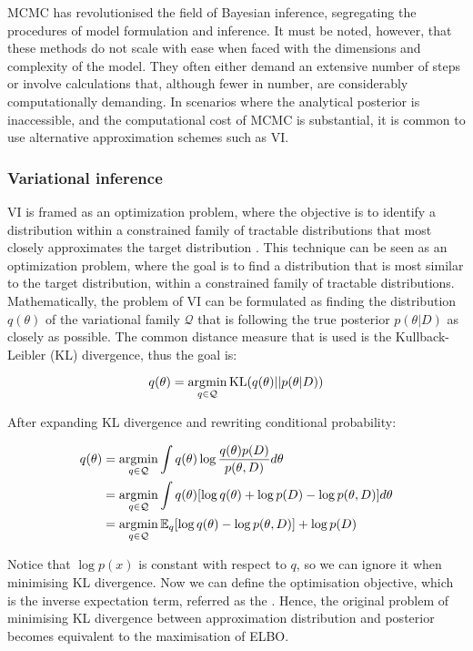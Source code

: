 \ac{MCMC} has revolutionised the field of Bayesian inference, segregating the procedures of model formulation and inference. It must be noted, however, that these methods do not scale with ease when faced with the dimensions and complexity of the model. They often either demand an extensive number of steps or involve calculations that, although fewer in number, are considerably computationally demanding. In scenarios where the analytical posterior is inaccessible, and the computational cost of \ac{MCMC} is substantial, it is common to use alternative approximation schemes such as \ac{VI}.

\subsubsection*{Variational inference}
\acl{VI} is framed as an optimization problem, where the objective is to identify a distribution within a constrained family of tractable distributions that most closely approximates the target distribution \parencite{Blei2017-dm}. This technique can be seen as an optimization problem, where the goal is to find a distribution that is most similar to the target distribution, within a constrained family of tractable distributions. Mathematically, the problem of \acl{VI} can be formulated as finding the distribution $q(\theta)$ of the variational family $\mathcal{Q}$ that is following the true posterior $p(\theta | D)$ as closely as possible. The common distance measure that is used is the Kullback-Leibler (KL) divergence, thus the goal is:

\begin{equation}
q(\theta) = \operatorname*{\arg\!\min}_{q \in \mathcal{Q}} \text{KL}(q(\theta) || p(\theta | D))  
\end{equation}

After expanding KL divergence and rewriting conditional probability:

\begin{align}
q(\theta) &= \operatorname*{\arg\!\min}_{q \in \mathcal{Q}} \int q(\theta) \log \frac{q(\theta) p(D)}{p(\theta, D)} d\theta \\
&= \operatorname*{\arg\!\min}_{q \in \mathcal{Q}} \int q(\theta) [\log q(\theta) + \log p(D) - \log p(\theta, D)] d\theta \\
&= \operatorname*{\arg\!\min}_{q \in \mathcal{Q}} \mathbb{E}_q [\log q(\theta) -  \log p(\theta, D)] + \log p(D)
\end{align}

Notice that $\log p(x)$ is constant with respect to $q$, so we can ignore it when minimising KL divergence. Now we can define the optimisation objective, which is the inverse expectation term, referred as the . Hence, the original problem of minimising KL divergence between approximation distribution and posterior becomes equivalent to the maximisation of \ac{ELBO}. 

